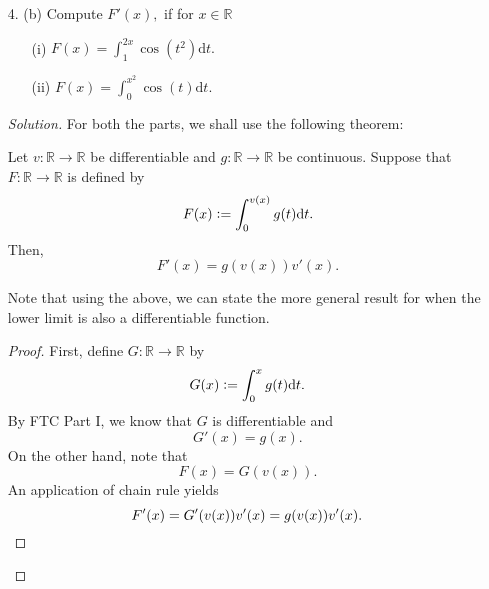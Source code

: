 \documentclass[12pt]{article}
\theoremstyle{definition}
\newenvironment{soln}{\begin{proof}[Solution]}{\end{proof}}
\begin{document}
\begin{itemize}
\begin{soln}
\begin{itemize}
			Then, $S_n = R(f', P_n, t_n).$ Since $\|P_n\| = 1/n \to 0,$ it follows that
			\begin{equation*} 
				\lim_{n\to \infty}R(f, P_n, t_n) = \int_{0}^{1} \cos(\pi x) {\mathrm{d}}x = \int_{0}^{1} f'(x) {\mathrm{d}}x.
			\end{equation*}
			By FTC Part II, we have it that
			\begin{equation*} 
				\lim_{n\to \infty}S_n = \int_{0}^{1} f'(x) {\mathrm{d}}x = f(1) - f(0) = 0. \qedhere
			\end{equation*}
		\end{itemize}
	\end{soln}
	\newpage
	\item[4. (b)] Compute $F'(x),$ if for $x \in \mathbb{R}$
	\begin{itemize}
		\item[(i)] $F(x) = \displaystyle\int_{1}^{2x} \cos(t^2) {\mathrm{d}}t.$
		\item[(ii)] $F(x) = \displaystyle\int_{0}^{x^2} \cos(t) {\mathrm{d}}t.$
	\end{itemize}

	\begin{soln}
		For both the parts, we shall use the following theorem:
		
		\begin{thm}
			Let $v:\mathbb{R} \to \mathbb{R}$ be differentiable and $g:\mathbb{R}\to\mathbb{R}$ be continuous. Suppose that $F:\mathbb{R}\to\mathbb{R}$ is defined by
			\begin{equation*} 
				F(x) \vcentcolon= \int_{0}^{v(x)} g(t) {\mathrm{d}}t.
			\end{equation*}
			Then,
			\begin{equation*} 
				F'(x) = g(v(x))v'(x).
			\end{equation*}
		\end{thm}
		Note that using the above, we can state the more general result for when the lower limit is also a differentiable function.

		\begin{proof} 
			First, define $G:\mathbb{R}\to\mathbb{R}$ by
			\begin{equation*} 
				G(x) \vcentcolon= \int_{0}^{x} g(t) {\mathrm{d}}t.
			\end{equation*}
			By FTC Part I, we know that $G$ is differentiable and
			\begin{equation*} 
				G'(x) = g(x).
			\end{equation*}
			On the other hand, note that
			\begin{equation*} 
				F(x) = G(v(x)).
			\end{equation*}
			An application of chain rule yields
			\begin{equation*} 
				F'(x) = G'(v(x))v'(x) = g(v(x))v'(x). \qedhere
			\end{equation*}
		\end{proof}


\end{soln}
\end{itemize}
\end{document}
